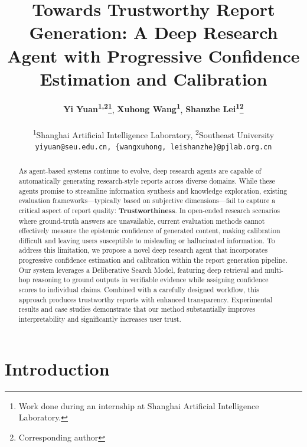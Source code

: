 \documentclass[11pt]{article}
\title{Towards Trustworthy Report Generation: A Deep Research Agent with Progressive Confidence Estimation and Calibration}
\author{
  \textbf{Yi Yuan\textsuperscript{1,2}\thanks{Work done during an internship at Shanghai Artificial Intelligence Laboratory.}},
  \textbf{Xuhong Wang\textsuperscript{1}},
  \textbf{Shanzhe Lei\textsuperscript{1}\thanks{Corresponding author}}
  \\
  \\
  \textsuperscript{1}Shanghai Artificial Intelligence Laboratory,
  \textsuperscript{2}Southeast University
  \\
  \small{
  \texttt{yiyuan@seu.edu.cn, \{wangxuhong, leishanzhe\}@pjlab.org.cn}
    }
}
\begin{document}
\maketitle
\begin{abstract}

As agent-based systems continue to evolve, deep research agents are capable of automatically generating research-style reports across diverse domains. While these agents promise to streamline information synthesis and knowledge exploration, existing evaluation frameworks—typically based on subjective dimensions—fail to capture a critical aspect of report quality: \textbf{Trustworthiness}. In open-ended research scenarios where ground-truth answers are unavailable, current evaluation methods cannot effectively measure the epistemic confidence of generated content, making calibration difficult and leaving users susceptible to misleading or hallucinated information. To address this limitation, we propose a novel deep research agent that incorporates progressive confidence estimation and calibration within the report generation pipeline. Our system leverages a Deliberative Search Model, featuring deep retrieval and multi-hop reasoning to ground outputs in verifiable evidence while assigning confidence scores to individual claims. Combined with a carefully designed workflow, this approach produces trustworthy reports with enhanced transparency. Experimental results and case studies demonstrate that our method substantially improves interpretability and significantly increases user trust.

\end{abstract}

\section{Introduction}

\end{document}

